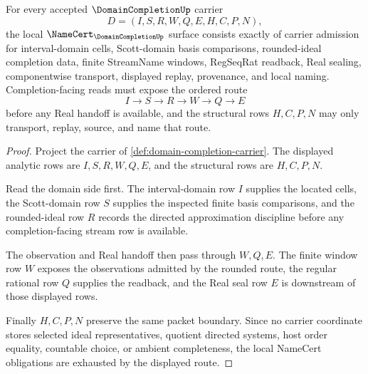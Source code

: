 \begin{theorem}
\label{thm:domain-completion-namecert-obligations}
For every accepted $\DomainCompletionUp$ carrier
$$
D=(I,S,R,W,Q,E,H,C,P,N),
$$
the local $\NameCert_{\DomainCompletionUp}$ surface consists exactly of carrier admission for interval-domain cells, Scott-domain basis comparisons, rounded-ideal completion data, finite StreamName windows, RegSeqRat readback, Real sealing, componentwise transport, displayed replay, provenance, and local naming. Completion-facing reads must expose the ordered route
$$
I \to S \to R \to W \to Q \to E
$$
before any Real handoff is available, and the structural rows $H,C,P,N$ may only transport, replay, source, and name that route.
\end{theorem}
\begin{proof}
Project the carrier of \autoref{def:domain-completion-carrier}. The displayed analytic rows are $I,S,R,W,Q,E$, and the structural rows are $H,C,P,N$.

Read the domain side first. The interval-domain row $I$ supplies the located cells, the Scott-domain row $S$ supplies the inspected finite basis comparisons, and the rounded-ideal row $R$ records the directed approximation discipline before any completion-facing stream row is available.

The observation and Real handoff then pass through $W,Q,E$. The finite window row $W$ exposes the observations admitted by the rounded route, the regular rational row $Q$ supplies the readback, and the Real seal row $E$ is downstream of those displayed rows.

Finally $H,C,P,N$ preserve the same packet boundary. Since no carrier coordinate stores selected ideal representatives, quotient directed systems, host order equality, countable choice, or ambient completeness, the local NameCert obligations are exhausted by the displayed route.
\end{proof}

